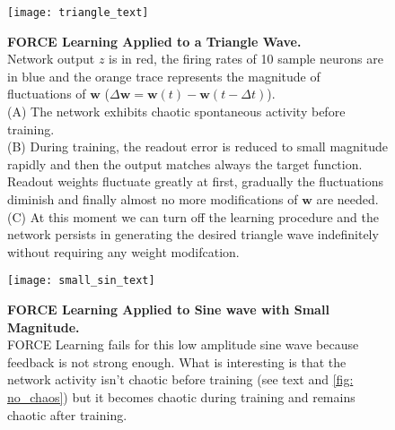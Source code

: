 \vspace*{-1em}
\begin{figure}[H]
  \centering
  \texttt{[image: triangle\_text]}
  \caption{
    \textbf{FORCE Learning Applied to a Triangle Wave.}\\[0.1 em]
    Network output $z$ is in red, the firing rates of 10 sample neurons
    are in blue and the orange trace represents the magnitude of
    fluctuations of $\mathbf{w}$ 
    ($\Delta \mathbf{w} = \mathbf{w}(t) - \mathbf{w}(t - \Delta t)$).\\[0.1em]
    (A) The network exhibits chaotic spontaneous activity before training.
    \\[0.1em]
    (B) During training, the readout error is reduced to small magnitude 
    rapidly and then the output matches always the target function.
    Readout weights fluctuate greatly at first, gradually the fluctuations
    diminish and finally almost no more modifications of $\mathbf{w}$ are 
    needed.\\[0.1 em]
    (C) At this moment we can turn off the learning procedure and the network 
    persists in generating the desired triangle wave indefinitely
    without requiring any weight modifcation.
  }
  \label{fig: triangle}
\end{figure}

\vfill

\begin{figure}[H]
  \centering
  \texttt{[image: small\_sin\_text]}
  \caption{
    \textbf{FORCE Learning Applied to Sine wave with Small Magnitude.}
    \\[0.1em]
    FORCE Learning fails for this low amplitude sine wave because
    feedback is not strong enough. What is interesting is that the network
    activity isn't chaotic before training 
    (see text and \autoref{fig: no_chaos})
    but it becomes chaotic during training and remains chaotic after training.
  }
  \label{fig: small_sin}
\end{figure}
\vfill

\newpage

